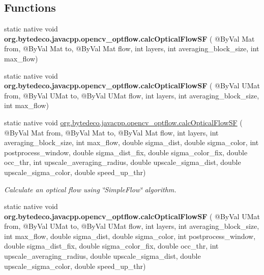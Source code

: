 \subsection*{Functions}
\begin{DoxyCompactItemize}
\item 
\mbox{\label{group__optflow_gac3566ed874933bad6b2825c00f37bfac}} 
static native void {\bfseries org.\+bytedeco.\+javacpp.\+opencv\+\_\+optflow.\+calc\+Optical\+Flow\+SF} ( @By\+Val Mat from, @By\+Val Mat to, @By\+Val Mat flow, int layers, int averaging\+\_\+block\+\_\+size, int max\+\_\+flow)
\item 
\mbox{\label{group__optflow_ga29dd3fec5011cf1d5c7fa051ff1c38ad}} 
static native void {\bfseries org.\+bytedeco.\+javacpp.\+opencv\+\_\+optflow.\+calc\+Optical\+Flow\+SF} ( @By\+Val U\+Mat from, @By\+Val U\+Mat to, @By\+Val U\+Mat flow, int layers, int averaging\+\_\+block\+\_\+size, int max\+\_\+flow)
\item 
static native void \hyperlink{group__optflow_ga76902de70b538596bed7e39b7777384d}{org.\+bytedeco.\+javacpp.\+opencv\+\_\+optflow.\+calc\+Optical\+Flow\+SF} ( @By\+Val Mat from, @By\+Val Mat to, @By\+Val Mat flow, int layers, int averaging\+\_\+block\+\_\+size, int max\+\_\+flow, double sigma\+\_\+dist, double sigma\+\_\+color, int postprocess\+\_\+window, double sigma\+\_\+dist\+\_\+fix, double sigma\+\_\+color\+\_\+fix, double occ\+\_\+thr, int upscale\+\_\+averaging\+\_\+radius, double upscale\+\_\+sigma\+\_\+dist, double upscale\+\_\+sigma\+\_\+color, double speed\+\_\+up\+\_\+thr)
\begin{DoxyCompactList}\small\item\em Calculate an optical flow using \char`\"{}\+Simple\+Flow\char`\"{} algorithm. \end{DoxyCompactList}\item 
\mbox{\label{group__optflow_gaf778fa8a2d9e5d336c9e66f1f6577271}} 
static native void {\bfseries org.\+bytedeco.\+javacpp.\+opencv\+\_\+optflow.\+calc\+Optical\+Flow\+SF} ( @By\+Val U\+Mat from, @By\+Val U\+Mat to, @By\+Val U\+Mat flow, int layers, int averaging\+\_\+block\+\_\+size, int max\+\_\+flow, double sigma\+\_\+dist, double sigma\+\_\+color, int postprocess\+\_\+window, double sigma\+\_\+dist\+\_\+fix, double sigma\+\_\+color\+\_\+fix, double occ\+\_\+thr, int upscale\+\_\+averaging\+\_\+radius, double upscale\+\_\+sigma\+\_\+dist, double upscale\+\_\+sigma\+\_\+color, double speed\+\_\+up\+\_\+thr)

\end{DoxyCompactItemize}
